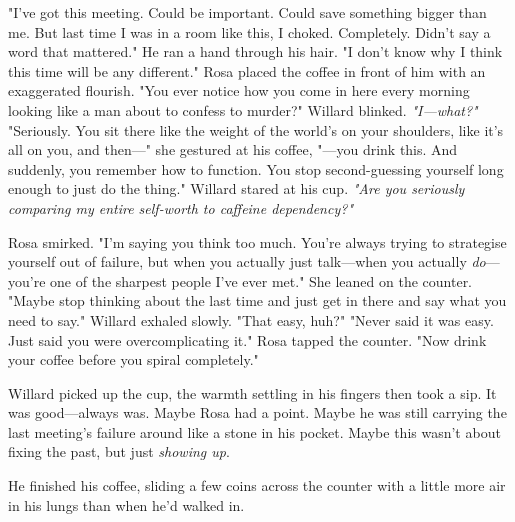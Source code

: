 \smallskip
"I’ve got this meeting. Could be important. Could save something bigger than me. But last time I was in a room like this, I choked. Completely. Didn’t say a word that mattered." He ran a hand through his hair. "I don’t know why I think this time will be any different."
\smallskip
Rosa placed the coffee in front of him with an exaggerated flourish. "You ever notice how you come in here every morning looking like a man about to confess to murder?"
\smallskip
Willard blinked. \textit{"I—what?"}
\smallskip
"Seriously. You sit there like the weight of the world’s on your shoulders, like it’s all on you, and then—"  she gestured at his coffee, "—you drink this. And suddenly, you remember how to function. You stop second-guessing yourself long enough to just do the thing."
\smallskip
Willard stared at his cup. \textit{"Are you seriously comparing my entire self-worth to caffeine dependency?"}
\smallskip

Rosa smirked. "I’m saying you think too much. You’re always trying to strategise yourself out of failure, but when you actually just talk—when you actually \textit{do}—you’re one of the sharpest people I’ve ever met." She leaned on the counter. "Maybe stop thinking about the last time and just get in there and say what you need to say."
\smallskip
Willard exhaled slowly. "That easy, huh?"
\smallskip
"Never said it was easy. Just said you were overcomplicating it." Rosa tapped the counter. "Now drink your coffee before you spiral completely."
\smallskip

Willard picked up the cup, the warmth settling in his fingers then took a sip. It was good—always was. Maybe Rosa had a point. Maybe he was still carrying the last meeting’s failure around like a stone in his pocket. Maybe this wasn’t about fixing the past, but just \textit{showing up}.

He finished his coffee, sliding a few coins across the counter with a little more air in his lungs than when he’d walked in.
\newpage
